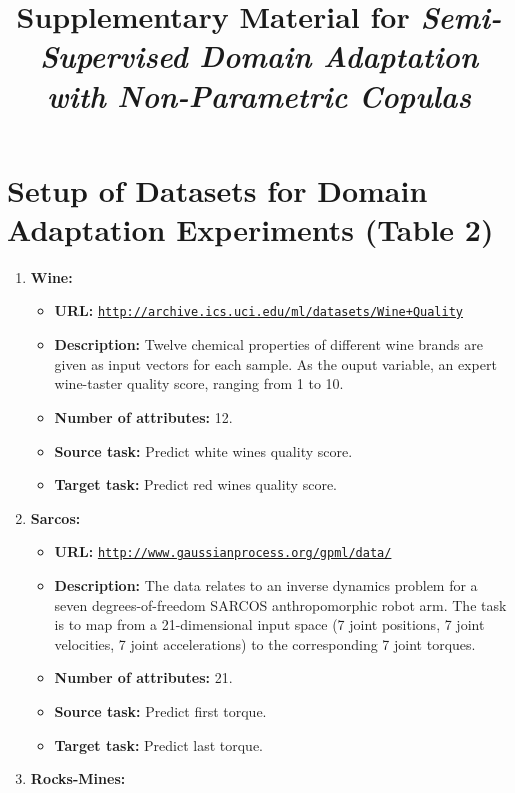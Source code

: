 \documentclass{article}
\begin{document}
\title{Supplementary Material for \emph{Semi-Supervised Domain Adaptation with Non-Parametric Copulas}}
\nipsfinalcopy
\maketitle
\section*{Setup of Datasets for Domain Adaptation Experiments (Table 2)}
\begin{enumerate}
  \item \textbf{Wine:} 
    \begin{itemize}
      \item \textbf{URL:} \href{http://archive.ics.uci.edu/ml/datasets/Wine+Quality}{\texttt{http://archive.ics.uci.edu/ml/datasets/Wine+Quality}}
      \item \textbf{Description:} Twelve chemical properties of different wine brands are given as input vectors for each sample. As
            the ouput variable, an expert wine-taster quality score, ranging from 1 to 10.
      \item \textbf{Number of attributes:} 12.
      \item \textbf{Source task:} Predict white wines quality score.
      \item \textbf{Target task:} Predict red wines quality score.
    \end{itemize}
  \item \textbf{Sarcos:} 
    \begin{itemize}
      \item \textbf{URL:} \href{http://www.gaussianprocess.org/gpml/data/}{\texttt{http://www.gaussianprocess.org/gpml/data/}}
      \item \textbf{Description:} The data relates to an inverse dynamics problem for a seven degrees-of-freedom SARCOS anthropomorphic robot arm. The task is to map from a 21-dimensional input space (7 joint positions, 7 joint velocities, 7 joint accelerations) to the corresponding 7 joint torques. 
      \item \textbf{Number of attributes:} 21.
      \item \textbf{Source task:} Predict first torque.
      \item \textbf{Target task:} Predict last  torque.
    \end{itemize}
  \item \textbf{Rocks-Mines:} 
    \begin{itemize}

\end{itemize}
\end{enumerate}
\end{document}
